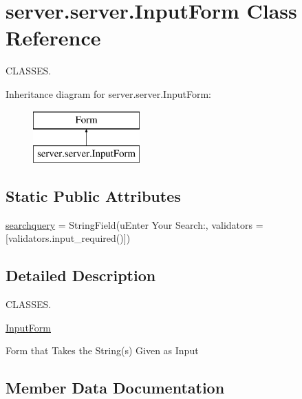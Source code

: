 \hypertarget{classserver_1_1server_1_1_input_form}{}\section{server.\+server.\+Input\+Form Class Reference}
\label{classserver_1_1server_1_1_input_form}


C\+L\+A\+S\+S\+ES.  


Inheritance diagram for server.\+server.\+Input\+Form\+:\begin{figure}[H]
\begin{center}
\leavevmode
\includegraphics[height=2.000000cm]{classserver_1_1server_1_1_input_form}
\end{center}
\end{figure}
\subsection*{Static Public Attributes}
\begin{DoxyCompactItemize}
\item 
\mbox{\hyperlink{classserver_1_1server_1_1_input_form_a97d0f535c9311f8bddaeee98f8c85021}{searchquery}} = String\+Field(u\textquotesingle{}Enter Your Search\+:\textquotesingle{}, validators = \mbox{[}validators.\+input\+\_\+required()\mbox{]})
\end{DoxyCompactItemize}


\subsection{Detailed Description}
C\+L\+A\+S\+S\+ES. 

\mbox{\hyperlink{classserver_1_1server_1_1_input_form}{Input\+Form}}

Form that Takes the String(s) Given as Input 

\subsection{Member Data Documentation}
\mbox{\label{classserver_1_1server_1_1_input_form_a97d0f535c9311f8bddaeee98f8c85021}} 
